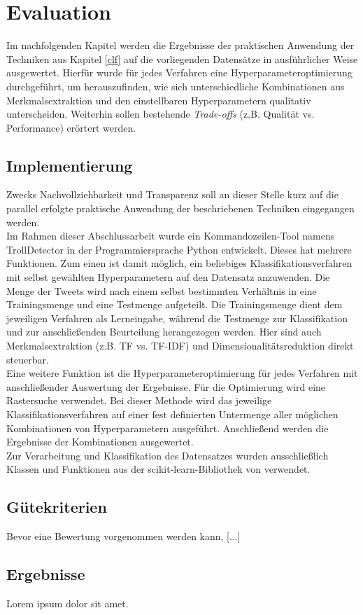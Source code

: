 \section{Evaluation}\raggedbottom
Im nachfolgenden Kapitel werden die Ergebnisse der praktischen Anwendung der Techniken aus Kapitel \ref{clf} auf die vorliegenden Datensätze in ausführlicher Weise ausgewertet. Hierfür wurde für jedes Verfahren eine Hyperparameteroptimierung durchgeführt, um herauszufinden, wie sich unterschiedliche Kombinationen aus  Merkmalsextraktion und den einstellbaren Hyperparametern qualitativ unterscheiden. Weiterhin sollen bestehende \textit{Trade-offs} (z.B. Qualität vs. Performance) erörtert werden.
\subsection{Implementierung} 
Zwecks Nachvollziehbarkeit und Transparenz soll an dieser Stelle kurz auf die parallel erfolgte praktische Anwendung der beschriebenen Techniken eingegangen werden.\\
Im Rahmen dieser Abschlussarbeit wurde ein Kommandozeilen-Tool namens \glqq TrollDetector\grqq{} in der Programmiersprache Python entwickelt. Dieses hat mehrere Funktionen. Zum einen ist damit möglich, ein beliebiges Klassifikationsverfahren mit selbst gewählten Hyperparametern auf den Datensatz anzuwenden. Die Menge der Tweets wird nach einem selbst bestimmten Verhältnis in eine Trainingsmenge und eine Testmenge aufgeteilt. Die Trainingsmenge dient dem jeweiligen Verfahren als Lerneingabe, während die Testmenge zur Klassifikation und zur anschließenden Beurteilung herangezogen werden. Hier sind auch Merkmalsextraktion (z.B. TF vs. TF-IDF) und Dimensionalitätsreduktion direkt steuerbar.\\
Eine weitere Funktion ist die Hyperparameteroptimierung für jedes Verfahren mit anschließender Auswertung der Ergebnisse. Für die Optimierung wird eine Rastersuche verwendet. Bei dieser Methode wird das jeweilige Klassifikationsverfahren auf einer fest definierten Untermenge aller möglichen Kombinationen von Hyperparametern ausgeführt. Anschließend werden die Ergebnisse der Kombinationen ausgewertet.\\
Zur Verarbeitung und Klassifikation des Datensatzes wurden ausschließlich Klassen und Funktionen aus der \glqq scikit-learn\grqq-Bibliothek von \citet{scikit-learn} verwendet.
\subsection{Gütekriterien}
Bevor eine Bewertung vorgenommen werden kann, [...]

\pagebreak\pagebreak
\subsection{Ergebnisse}
Lorem ipsum dolor sit amet.